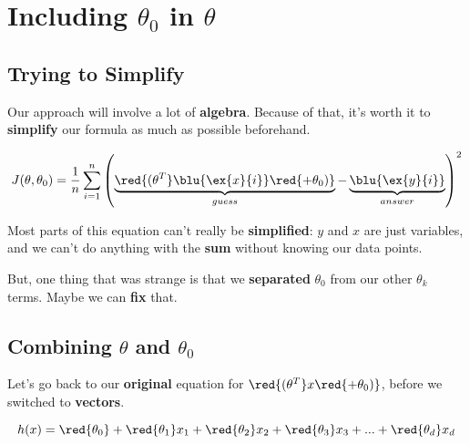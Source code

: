     
\section*{Including $\theta_0$ in $\theta$}
    
    \subsection*{Trying to Simplify}
        
        Our approach will involve a lot of \textbf{algebra}. Because of that, it's worth it to \textbf{simplify} our formula as much as possible beforehand.
        
        \begin{equation}
            J(\theta,\theta_0) = 
                        \frac{1}{n}  \sum_{i=1}^n 
                        \left( 
                            \underbrace{
                                \red{ (\theta^T} \blu{\ex{x}{i}} \red{ + \theta_0) } 
                            }_{guess}
                            - \underbrace{
                                \blu{\ex{y}{i}}
                            }_{answer}
                        \right)^2 
        \end{equation}
        
        Most parts of this equation can't really be \textbf{simplified}: $y$ and $x$ are just variables, and we can't do anything with the \textbf{sum} without knowing our data points.
        
        But, one thing that was strange is that we \textbf{separated} $\theta_0$ from our other $\theta_k$ terms. Maybe we can \textbf{fix} that.
        
    \subsection*{Combining $\theta$ and $\theta_0$}
        
         Let's go back to our \textbf{original} equation for $\red{ (\theta^T} x \red{ + \theta_0) } $, before we switched to \textbf{vectors}.
        
        \begin{equation}
            h(x) = \red{\theta_0} + \red{\theta_1}x_1 + \red{\theta_2}x_2 + \red{\theta_3}x_3 + ... + \red{\theta_d}x_d
        \end{equation}
        

